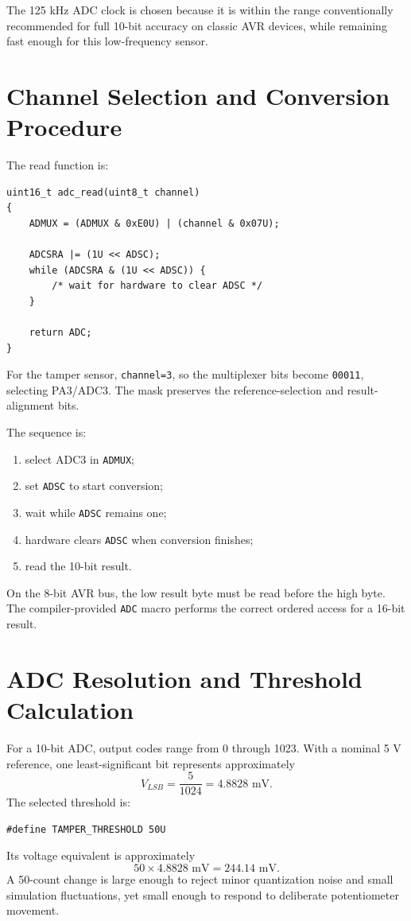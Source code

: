 \documentclass[11pt,a4paper]{article}
\begin{document}
The 125 kHz ADC clock is chosen because it is within the range conventionally recommended for full 10-bit accuracy on classic AVR devices, while remaining fast enough for this low-frequency sensor.

\section{Channel Selection and Conversion Procedure}
The read function is:
\begin{lstlisting}[style=cstyle,caption={Single-channel ADC read.}]
uint16_t adc_read(uint8_t channel)
{
    ADMUX = (ADMUX & 0xE0U) | (channel & 0x07U);

    ADCSRA |= (1U << ADSC);
    while (ADCSRA & (1U << ADSC)) {
        /* wait for hardware to clear ADSC */
    }

    return ADC;
}
\end{lstlisting}

For the tamper sensor, \texttt{channel=3}, so the multiplexer bits become \texttt{00011}, selecting PA3/ADC3. The mask preserves the reference-selection and result-alignment bits.

The sequence is:
\begin{enumerate}
  \item select ADC3 in \texttt{ADMUX};
  \item set \texttt{ADSC} to start conversion;
  \item wait while \texttt{ADSC} remains one;
  \item hardware clears \texttt{ADSC} when conversion finishes;
  \item read the 10-bit result.
\end{enumerate}

On the 8-bit AVR bus, the low result byte must be read before the high byte. The compiler-provided \texttt{ADC} macro performs the correct ordered access for a 16-bit result.

\section{ADC Resolution and Threshold Calculation}
For a 10-bit ADC, output codes range from 0 through 1023. With a nominal 5 V reference, one least-significant bit represents approximately
\[
V_{LSB}=\frac{5}{1024}=4.8828\text{ mV}.
\]
The selected threshold is:
\begin{lstlisting}[style=cstyle]
#define TAMPER_THRESHOLD 50U
\end{lstlisting}
Its voltage equivalent is approximately
\[
50\times4.8828\text{ mV}=244.14\text{ mV}.
\]
A 50-count change is large enough to reject minor quantization noise and small simulation fluctuations, yet small enough to respond to deliberate potentiometer movement.
\end{document}
